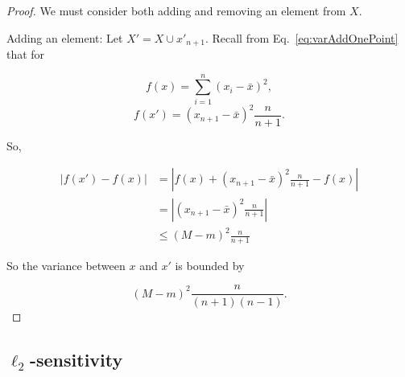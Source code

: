 \documentclass[11pt]{scrartcl} %
\begin{document}
 \begin{proof}
 	We must consider both adding and removing an element from $X$. \newline

 	Adding an element: \newline
 	Let $X' = X \cup x'_{n+1}$. Recall from Eq.~\ref{eq:varAddOnePoint} that for 
	
	$$ f(x) = \sum_{i=1}^n (x_i - \bar{x})^2, $$
	$$ f(x') = (x_{n+1} - \bar{x})^2 \frac{n}{n+1}.$$ 
	
	So,
	
	\begin{align*}
	\left\vert f(x') - f(x) \right\vert &= \left\vert f(x) + (x_{n+1} - \bar{x})^2 \frac{n}{n+1} - f(x) \right\vert \\
		&= \left\vert (x_{n+1} - \bar{x})^2 \frac{n}{n+1} \right\vert \\
		&\le \left( M-m \right)^2 \frac{n}{n+1}
	\end{align*}
	
	So the variance between $x$ and $x'$ is bounded by
	
	$$ \left( M-m \right)^2 \frac{n}{(n+1)(n-1)}.$$ 
 \end{proof}

\subsection{$\ell_2$-sensitivity}



\end{document}
